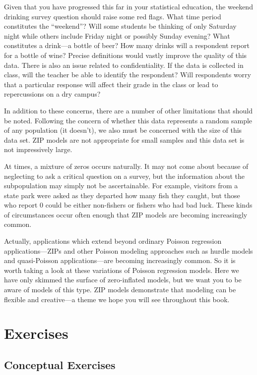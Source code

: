 \documentclass[
]{krantz}
\begin{document}
Given that you have progressed this far in your statistical education, the weekend drinking survey question should raise some red flags. What time period constitutes the ``weekend''? Will some students be thinking of only Saturday night while others include Friday night or possibly Sunday evening? What constitutes a drink---a bottle of beer? How many drinks will a respondent report for a bottle of wine? Precise definitions would vastly improve the quality of this data. There is also an issue related to confidentiality. If the data is collected in class, will the teacher be able to identify the respondent? Will respondents worry that a particular response will affect their grade in the class or lead to repercussions on a dry campus?

In addition to these concerns, there are a number of other limitations that should be noted. Following the concern of whether this data represents a random sample of any population (it doesn't), we also must be concerned with the size of this data set. ZIP models are not appropriate for small samples and this data set is not impressively large.

At times, a mixture of zeros occurs naturally. It may not come about because of neglecting to ask a critical question on a survey, but the information about the subpopulation may simply not be ascertainable. For example, visitors from a state park were asked as they departed how many fish they caught, but those who report 0 could be either non-fishers or fishers who had bad luck. These kinds of circumstances occur often enough that ZIP models are becoming increasingly common.

Actually, applications which extend beyond ordinary Poisson regression applications---ZIPs and other Poisson modeling approaches such as hurdle models and quasi-Poisson applications---are becoming increasingly common. So it is worth taking a look at these variations of Poisson regression models. Here we have only skimmed the surface of zero-inflated models, but we want you to be aware of models of this type. ZIP models demonstrate that modeling can be flexible and creative---a theme we hope you will see throughout this book.

\hypertarget{exercises-3}{%
\section{Exercises}\label{exercises-3}}

\hypertarget{exer:concept}{%
\subsection{Conceptual Exercises}\label{exer:concept}}
\end{document}
